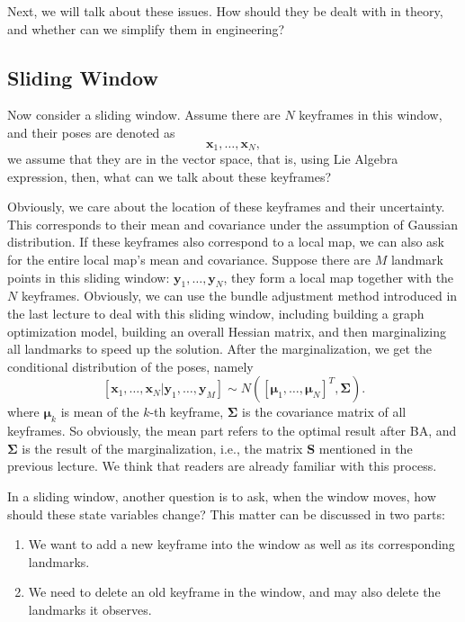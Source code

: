 Next, we will talk about these issues. How should they be dealt with in theory, and whether can we simplify them in engineering?

\subsection{Sliding Window}
Now consider a sliding window. Assume there are $N$ keyframes in this window, and their poses are denoted as $$\bm{x}_1, \ldots, \bm{x}_N,$$ we assume that they are in the vector space, that is, using Lie Algebra expression, then, what can we talk about these keyframes?

Obviously, we care about the location of these keyframes and their uncertainty. This corresponds to their mean and covariance under the assumption of Gaussian distribution. If these keyframes also correspond to a local map, we can also ask for the entire local map's mean and covariance. Suppose there are $M$ landmark points in this sliding window: $\bm{y}_1, \ldots, \bm{y}_N$, they form a local map together with the $N$ keyframes. Obviously, we can use the bundle adjustment method introduced in the last lecture to deal with this sliding window, including building a graph optimization model, building an overall Hessian matrix, and then marginalizing all landmarks to speed up the solution. After the marginalization, we get the conditional distribution of the poses, namely $$[\bm{x}_1, \ldots, \bm{x}_N | \bm{y}_1, \ldots, \bm{y}_M ] \sim N([\boldsymbol{\mu }_1, \ldots, \boldsymbol{\mu}_N]^T, \boldsymbol{\Sigma}).$$ where $\boldsymbol{\mu}_k$ is mean of the $k$-th keyframe, $\boldsymbol{\Sigma}$ is the covariance matrix of all keyframes. So obviously, the mean part refers to the optimal result after BA, and $\boldsymbol{\Sigma}$ is the result of the marginalization, i.e., the matrix $\bm{S}$ mentioned in the previous lecture. We think that readers are already familiar with this process.

In a sliding window, another question is to ask, when the window moves, how should these state variables change? This matter can be discussed in two parts:

\begin{enumerate}
	\item We want to add a new keyframe into the window as well as its corresponding landmarks.
	\item We need to delete an old keyframe in the window, and may also delete the landmarks it observes.
\end{enumerate}

